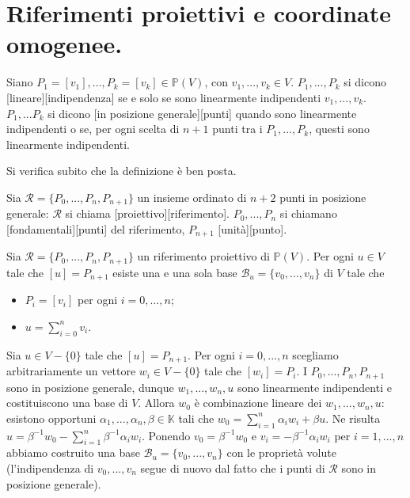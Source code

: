 \section{Riferimenti proiettivi e coordinate omogenee.}

\begin{Definition}\label{def14}
	Siano $P_1 = [v_1], ..., P_k = [v_k] \in \mathbb{P}(V)$, con $v_1, ..., v_k \in V$. $P_1, ..., P_k$ si dicono [lineare][indipendenza] se e solo se sono linearmente indipendenti $v_1, ..., v_k$. $P_1,... P_k$ si dicono [in posizione generale][punti] quando sono linearmente indipendenti o se, per ogni scelta di $n + 1$ punti tra i $P_1, ..., P_k$, questi sono linearmente indipendenti.
\end{Definition}
	\par Si verifica subito che la definizione \`e ben posta.
\begin{Definition}\label{def15}
	Sia $\mathcal{R} = \lbrace P_0, ..., P_n, P_{n + 1} \rbrace$ un insieme ordinato di $n + 2$ punti in posizione generale: $\mathcal{R}$ si chiama [proiettivo][riferimento]. $P_0, ..., P_n$ si chiamano [fondamentali][punti] del riferimento, $P_{n + 1}$ [unit\`a][punto].
\end{Definition}
\begin{Theorem}\label{th13}
	Sia $\mathcal{R} = \lbrace P_0, ..., P_n, P_{n + 1} \rbrace$ un riferimento proiettivo di $\mathbb{P}(V)$. Per ogni $u \in V$ tale che $[u] = P_{n + 1}$ esiste una e una sola base $\mathcal{B}_u = \lbrace v_0, ..., v_n \rbrace$ di $V$ tale che
\begin{itemize}
	\item $P_i = [v_i]$ per ogni $i = 0, ..., n$;
	\item $u = \sum_{i = 0}^n v_i$.
\end{itemize}
\end{Theorem}
\Proof Sia $u \in V - \lbrace 0 \rbrace$ tale che $[u] = P_{n + 1}$. Per ogni $i = 0, ..., n$ scegliamo arbitrariamente un vettore $w_i \in V - \lbrace 0 \rbrace$ tale che $[w_i] = P_i$. I $P_0, ..., P_n, P_{n + 1}$ sono in posizione generale, dunque $w_1, ..., w_n, u$ sono linearmente indipendenti e costituiscono una base di $V$. Allora $w_0$ \`e combinazione lineare dei $w_1, ..., w_n, u$: esistono opportuni $\alpha_1, ..., \alpha_n, \beta \in \mathbb{K}$ tali che $w_0 = \sum_{i = 1}^n \alpha_i w_i + \beta u$. Ne risulta $u = \beta^{-1}w_0 - \sum_{i = 1}^n \beta^{-1} \alpha_i w_i$. Ponendo $v_0 = \beta^{-1}w_0$ e $v_i = - \beta^{-1} \alpha_i w_i$ per $i = 1, ..., n$ abbiamo costruito una base $\mathcal{B}_u = \lbrace v_0, ..., v_n \rbrace$ con le propriet\`a volute (l'indipendenza di $v_0, ..., v_n$ segue di nuovo dal fatto che i punti di $\mathcal{R}$ sono in posizione generale).
